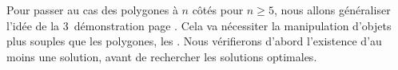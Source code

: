 Pour passer au cas des polygones à $n$ côtés pour $n \geq 5$, nous allons généraliser l'idée de la 3\ieme\ démonstration page \pageref{tri-topo-comp}. Cela va nécessiter la manipulation d'objets plus souples que les polygones, les \ncycles.
Nous vérifierons d’abord l’existence d’au moins une solution, 
avant de rechercher les solutions optimales.%
